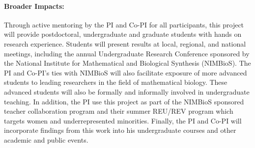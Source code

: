 \documentclass[11pt,fleqn]{article}
\begin{document}

\paragraph*{Broader Impacts:}
Through active mentoring by the PI and Co-PI for all participants, this project will provide postdoctoral, undergraduate and graduate students with hands on research experience.
Students will present results at local, regional, and national meetings, including the annual Undergraduate Research Conference sponsored by the National Institute for Mathematical and Biological Synthesis (NIMBioS).
The PI and Co-PI's ties with NIMBioS will also facilitate exposure of more  advanced students to leading researchers in the field of mathematical biology.
These advanced students will also be formally and informally involved in undergraduate teaching. %
In addition, the PI use this project as part of the  NIMBioS sponsored teacher collaboration program and their summer REU/REV program which targets women and underrepresented minorities.
Finally, the PI and Co-PI will incorporate findings from this work into his undergraduate courses and other academic and public events.

\end{document}
